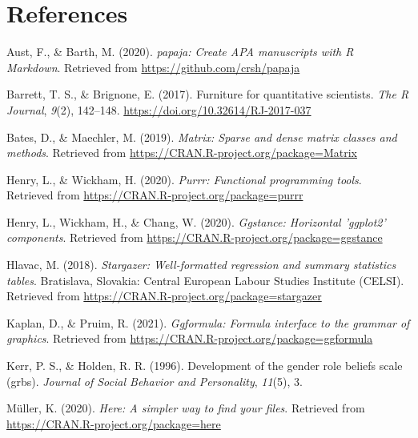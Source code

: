 \documentclass[
  english,
  man]{apa6}
\newlength{\cslhangindent}
\newenvironment{cslreferences}%
  {\setlength{\parindent}{0pt}%
  \everypar{\setlength{\hangindent}{\cslhangindent}}\ignorespaces}%
  {\par}
\begin{document}
\newpage

\hypertarget{references}{%
\section{References}\label{references}}

\begingroup
\setlength{\parindent}{-0.5in}
\setlength{\leftskip}{0.5in}

\hypertarget{refs}{}
\begin{cslreferences}
\leavevmode\hypertarget{ref-R-papaja}{}%
Aust, F., \& Barth, M. (2020). \emph{papaja: Create APA manuscripts with R Markdown}. Retrieved from \url{https://github.com/crsh/papaja}

\leavevmode\hypertarget{ref-R-RJ-2017-037}{}%
Barrett, T. S., \& Brignone, E. (2017). Furniture for quantitative scientists. \emph{The R Journal}, \emph{9}(2), 142--148. \url{https://doi.org/10.32614/RJ-2017-037}

\leavevmode\hypertarget{ref-R-Matrix}{}%
Bates, D., \& Maechler, M. (2019). \emph{Matrix: Sparse and dense matrix classes and methods}. Retrieved from \url{https://CRAN.R-project.org/package=Matrix}

\leavevmode\hypertarget{ref-R-purrr}{}%
Henry, L., \& Wickham, H. (2020). \emph{Purrr: Functional programming tools}. Retrieved from \url{https://CRAN.R-project.org/package=purrr}

\leavevmode\hypertarget{ref-R-ggstance}{}%
Henry, L., Wickham, H., \& Chang, W. (2020). \emph{Ggstance: Horizontal 'ggplot2' components}. Retrieved from \url{https://CRAN.R-project.org/package=ggstance}

\leavevmode\hypertarget{ref-R-stargazer}{}%
Hlavac, M. (2018). \emph{Stargazer: Well-formatted regression and summary statistics tables}. Bratislava, Slovakia: Central European Labour Studies Institute (CELSI). Retrieved from \url{https://CRAN.R-project.org/package=stargazer}

\leavevmode\hypertarget{ref-R-ggformula}{}%
Kaplan, D., \& Pruim, R. (2021). \emph{Ggformula: Formula interface to the grammar of graphics}. Retrieved from \url{https://CRAN.R-project.org/package=ggformula}

\leavevmode\hypertarget{ref-kerr1996development}{}%
Kerr, P. S., \& Holden, R. R. (1996). Development of the gender role beliefs scale (grbs). \emph{Journal of Social Behavior and Personality}, \emph{11}(5), 3.

\leavevmode\hypertarget{ref-R-here}{}%
Müller, K. (2020). \emph{Here: A simpler way to find your files}. Retrieved from \url{https://CRAN.R-project.org/package=here}


\end{cslreferences}
\end{document}
